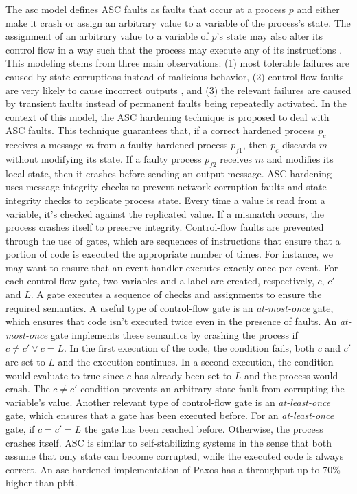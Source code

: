 The \acrfull{asc} model defines ASC faults as faults that occur at a process $p$ and either make it crash or assign an arbitrary value to a variable of the process's state. The assignment of an arbitrary value to a variable of $p$'s state may also alter its control flow in a way such that the process may execute any of its instructions \cite{Correia2012}. This modeling stems from three main observations: (1) most tolerable failures are caused by state corruptions instead of malicious behavior, (2) control-flow faults are very likely to cause incorrect outputs \cite{Kalbarczyk2003}, and (3) the relevant failures are caused by transient faults instead of permanent faults being repeatedly activated. In the context of this model, the ASC hardening technique is proposed to deal with ASC faults. This technique guarantees that, if a correct hardened process $p_c$ receives a message $m$ from a faulty hardened process $p_{f1}$, then $p_c$ discards $m$ without modifying its state. If a faulty process $p_{f2}$ receives $m$ and modifies its local state, then it crashes before sending an output message. ASC hardening uses message integrity checks to prevent network corruption faults and state integrity checks to replicate process state. Every time a value is read from a variable, it's checked against the replicated value. If a mismatch occurs, the process crashes itself to preserve integrity. Control-flow faults are prevented through the use of gates, which are sequences of instructions that ensure that a portion of code is executed the appropriate number of times. For instance, we may want to ensure that an event handler executes exactly once per event. For each control-flow gate, two variables and a label are created, respectively, $c$, $c'$ and $L$. A gate executes a sequence of checks and assignments to ensure the required semantics. A useful type of control-flow gate is an \textit{at-most-once} gate, which ensures that code isn't executed twice even in the presence of faults. An \textit{at-most-once} gate implements these semantics by crashing the process if $c \neq c' \vee c=L$. In the first execution of the code, the condition fails, both $c$ and $c'$ are set to $L$ and the execution continues. In a second execution, the condition would evaluate to true since $c$ has already been set to $L$ and the process would crash. The $c \neq c'$ condition prevents an arbitrary state fault from corrupting the variable's value. Another relevant type of control-flow gate is an \textit{at-least-once} gate, which ensures that a gate has been executed before. For an \textit{at-least-once} gate, if $c=c'=L$ the gate has been reached before. Otherwise, the process crashes itself. ASC is similar to self-stabilizing systems \cite{Dijkstra1974} in the sense that both assume that only state can become corrupted, while the executed code is always correct. An \acrshort{asc}-hardened implementation of Paxos has a throughput up to 70\% higher than \acrshort{pbft}. \par
